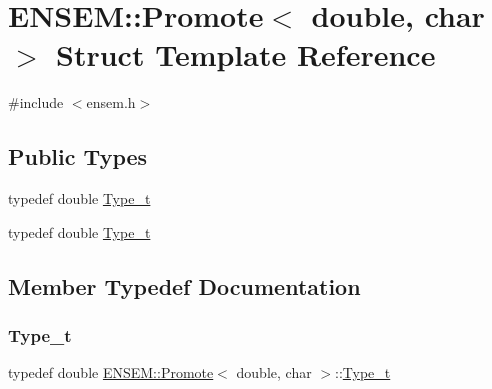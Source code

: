 \hypertarget{structENSEM_1_1Promote_3_01double_00_01char_01_4}{}\section{E\+N\+S\+EM\+:\+:Promote$<$ double, char $>$ Struct Template Reference}
\label{structENSEM_1_1Promote_3_01double_00_01char_01_4}


{\ttfamily \#include $<$ensem.\+h$>$}

\subsection*{Public Types}
\begin{DoxyCompactItemize}
\item 
typedef double \mbox{\hyperlink{structENSEM_1_1Promote_3_01double_00_01char_01_4_aa50bd72d8e60a859d481548688596791}{Type\+\_\+t}}
\item 
typedef double \mbox{\hyperlink{structENSEM_1_1Promote_3_01double_00_01char_01_4_aa50bd72d8e60a859d481548688596791}{Type\+\_\+t}}
\end{DoxyCompactItemize}


\subsection{Member Typedef Documentation}
\mbox{\label{structENSEM_1_1Promote_3_01double_00_01char_01_4_aa50bd72d8e60a859d481548688596791}} 
\subsubsection{\texorpdfstring{Type\_t}{Type\_t}\hspace{0.1cm}{\footnotesize\ttfamily [1/2]}}
{\footnotesize\ttfamily typedef double \mbox{\hyperlink{structENSEM_1_1Promote}{E\+N\+S\+E\+M\+::\+Promote}}$<$ double, char $>$\+::\mbox{\hyperlink{structENSEM_1_1Promote_3_01double_00_01char_01_4_aa50bd72d8e60a859d481548688596791}{Type\+\_\+t}}}

\mbox{\label{structENSEM_1_1Promote_3_01double_00_01char_01_4_aa50bd72d8e60a859d481548688596791}} 

